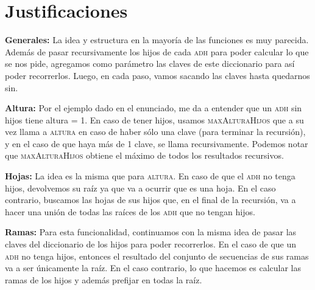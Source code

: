 \documentclass[10pt, a4paper]{article}
\begin{document}
\begin{tad}{}

\end{tad}

\section*{Justificaciones}
\noindent \textbf{Generales:} La idea y estructura en la mayor\'ia de las funciones es muy parecida. Adem\'as de pasar recursivamente los hijos de cada \textsc{adh} para poder calcular lo que se nos pide, agregamos como par\'ametro las claves de este diccionario para as\'i poder recorrerlos. Luego, en cada paso, vamos sacando las claves hasta quedarnos sin.

\noindent \textbf{Altura:} Por el ejemplo dado en el enunciado, me da a entender que un \textsc{adh} sin hijos tiene altura = 1.  En caso de tener hijos, usamos \textsc{maxAlturaHijos} que a su vez llama a \textsc{altura} en caso de haber s\'olo una clave (para terminar la recursi\'on), y en el caso de que haya m\'as de 1 clave, se llama recursivamente. Podemos notar que \textsc{maxAlturaHijos} obtiene el m\'aximo de todos los resultados recursivos.

\noindent \textbf{Hojas:} La idea es la misma que para \textsc{altura}. En caso de que el \textsc{adh} no tenga hijos, devolvemos su ra\'iz ya que va a ocurrir que es una hoja. En el caso contrario, buscamos las hojas de sus hijos que, en el final de la recursi\'on, va a hacer una uni\'on de todas las ra\'ices de los \textsc{adh} que no tengan hijos.

\noindent \textbf{Ramas:} Para esta funcionalidad, continuamos con la misma idea de pasar las claves del diccionario de los hijos para poder recorrerlos. En el caso de que un \textsc{adh} no tenga hijos, entonces el resultado del conjunto de secuencias de sus ramas va a ser \'unicamente la ra\'iz. En el caso contrario, lo que hacemos es calcular las ramas de los hijos y adem\'as prefijar en todas la ra\'iz.
\end{document}
